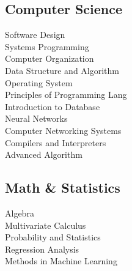 \documentclass[]{deedy-resume-openfont}
\begin{document}
\begin{minipage}[t]{0.33\textwidth}
    \subsection{Computer Science}
    Software Design \\ 
    Systems Programming \\ 
    Computer Organization \\ 
    Data Structure and Algorithm \\
    Operating System \\
    Principles of Programming Lang \\
    Introduction to Database \\
    Neural Networks \\
    Computer Networking Systems \\
    Compilers and Interpreters \\
    Advanced Algorithm \\ 
    
    
    \sectionsep
    \subsection{Math \& Statistics}
    Algebra  \\
    Multivariate Calculus \\ 
    Probability and Statistics \\
    Regression Analysis \\ 
    Methods in Machine Learning \\
    
    
    
    \end{minipage} 
    \hfill
\end{document}
